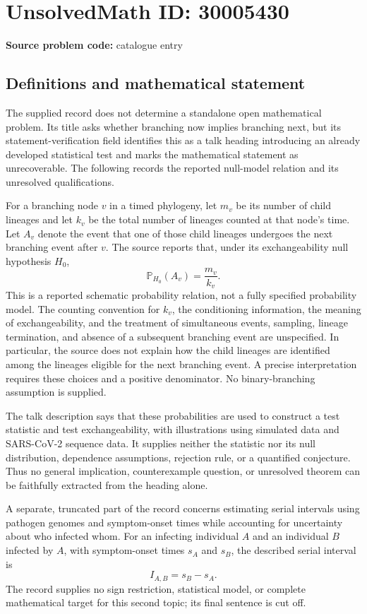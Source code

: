 \documentclass[11pt]{article}
\begin{document}
\section*{UnsolvedMath ID: 30005430}
\textbf{Source problem code:} catalogue entry
\subsection{Definitions and mathematical statement}
The supplied record does not determine a standalone open mathematical problem. Its title asks whether branching now implies branching next, but its statement-verification field identifies this as a talk heading introducing an already developed statistical test and marks the mathematical statement as unrecoverable. The following records the reported null-model relation and its unresolved qualifications.

For a branching node \(v\) in a timed phylogeny, let \(m_v\) be its number of child lineages and let \(k_v\) be the total number of lineages counted at that node's time. Let \(A_v\) denote the event that one of those child lineages undergoes the next branching event after \(v\). The source reports that, under its exchangeability null hypothesis \(H_0\),
\[
\mathbb{P}_{H_0}(A_v)=\frac{m_v}{k_v}.
\]
This is a reported schematic probability relation, not a fully specified probability model. The counting convention for \(k_v\), the conditioning information, the meaning of exchangeability, and the treatment of simultaneous events, sampling, lineage termination, and absence of a subsequent branching event are unspecified. In particular, the source does not explain how the child lineages are identified among the lineages eligible for the next branching event. A precise interpretation requires these choices and a positive denominator. No binary-branching assumption is supplied.

The talk description says that these probabilities are used to construct a test statistic and test exchangeability, with illustrations using simulated data and SARS-CoV-2 sequence data. It supplies neither the statistic nor its null distribution, dependence assumptions, rejection rule, or a quantified conjecture. Thus no general implication, counterexample question, or unresolved theorem can be faithfully extracted from the heading alone.

A separate, truncated part of the record concerns estimating serial intervals using pathogen genomes and symptom-onset times while accounting for uncertainty about who infected whom. For an infecting individual \(A\) and an individual \(B\) infected by \(A\), with symptom-onset times \(s_A\) and \(s_B\), the described serial interval is
\[
I_{A,B}=s_B-s_A.
\]
The record supplies no sign restriction, statistical model, or complete mathematical target for this second topic; its final sentence is cut off.
\end{document}
